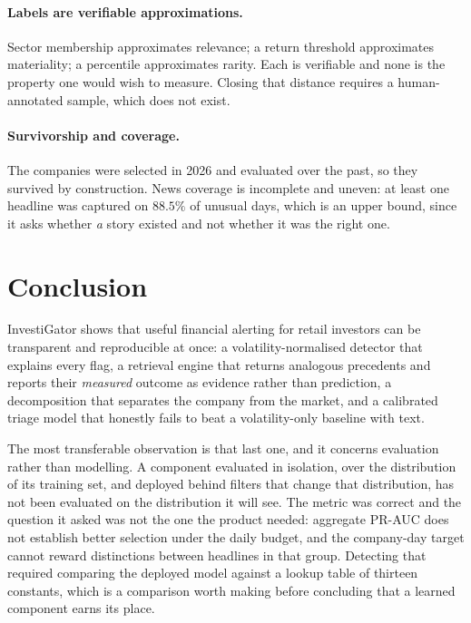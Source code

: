 \documentclass[runningheads]{llncs}
\begin{document}
\paragraph{Labels are verifiable approximations.} Sector membership approximates relevance;
a return threshold approximates materiality; a percentile approximates rarity. Each is
verifiable and none is the property one would wish to measure. Closing that distance
requires a human-annotated sample, which does not exist.

\paragraph{Survivorship and coverage.} The companies were selected in 2026 and evaluated
over the past, so they survived by construction. News coverage is incomplete and uneven:
at least one headline was captured on $88.5\%$ of unusual days, which is an upper bound,
since it asks whether \emph{a} story existed and not whether it was the right one.

\section{Conclusion}

InvestiGator shows that useful financial alerting for retail investors can be transparent
and reproducible at once: a volatility-normalised detector that explains every flag, a
retrieval engine that returns analogous precedents and reports their \emph{measured}
outcome as evidence rather than prediction, a decomposition that separates the company from
the market, and a calibrated triage model that honestly fails to beat a volatility-only
baseline with text.

The most transferable observation is that last one, and it concerns evaluation rather than
modelling. A component evaluated in isolation, over the distribution of its training set,
and deployed behind filters that change that distribution, has not been evaluated on the
distribution it will see. The metric was correct and the question it asked was not the one
the product needed: aggregate PR-AUC does not establish better selection under the daily
budget, and the company-day target cannot reward distinctions between headlines in that group.
Detecting that required comparing the deployed model against a lookup table of thirteen
constants, which is a comparison worth making before concluding that a learned component
earns its place.
\end{document}
